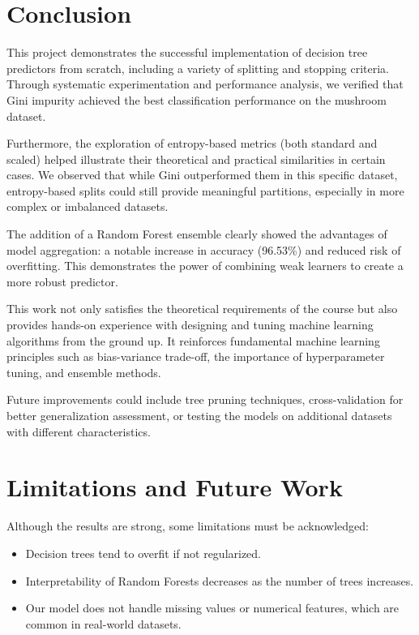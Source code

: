 \documentclass[11pt]{article}
\begin{document}
\section{Conclusion}
This project demonstrates the successful implementation of decision tree predictors from scratch, including a variety of splitting and stopping criteria. Through systematic experimentation and performance analysis, we verified that Gini impurity achieved the best classification performance on the mushroom dataset. 

Furthermore, the exploration of entropy-based metrics (both standard and scaled) helped illustrate their theoretical and practical similarities in certain cases. We observed that while Gini outperformed them in this specific dataset, entropy-based splits could still provide meaningful partitions, especially in more complex or imbalanced datasets.

The addition of a Random Forest ensemble clearly showed the advantages of model aggregation: a notable increase in accuracy (96.53\%) and reduced risk of overfitting. This demonstrates the power of combining weak learners to create a more robust predictor.

This work not only satisfies the theoretical requirements of the course but also provides hands-on experience with designing and tuning machine learning algorithms from the ground up. It reinforces fundamental machine learning principles such as bias-variance trade-off, the importance of hyperparameter tuning, and ensemble methods.

Future improvements could include tree pruning techniques, cross-validation for better generalization assessment, or testing the models on additional datasets with different characteristics.


\section{Limitations and Future Work}

Although the results are strong, some limitations must be acknowledged:
\begin{itemize}
    \item Decision trees tend to overfit if not regularized.
    \item Interpretability of Random Forests decreases as the number of trees increases.
    \item Our model does not handle missing values or numerical features, which are common in real-world datasets.
\end{itemize}
\end{document}
